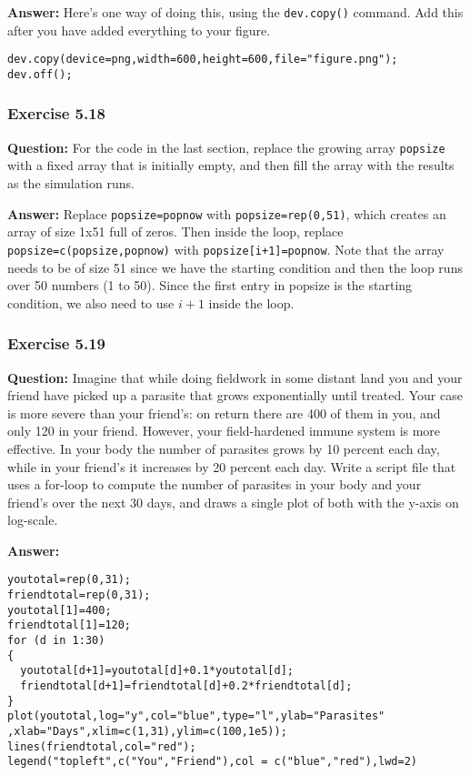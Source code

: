 \documentclass [11pt]{article}
\newcommand{\code}[1]{{\tt #1}}
\begin{document}
\textbf{Answer:} 
Here's one way of doing this, using the \code{dev.copy()} command. Add this after you have added everything to your figure.
\begin{verbatim}
dev.copy(device=png,width=600,height=600,file="figure.png"); dev.off();
\end{verbatim}



\subsubsection*{Exercise 5.18}
\textbf{Question:}
For the code in the last section, replace the growing array \code{popsize} with a fixed array that is initially empty, and then fill the array with the results as the simulation runs.

\textbf{Answer:} Replace \code{popsize=popnow} with \code{popsize=rep(0,51)}, which creates an array of size 1x51 full of zeros. Then inside the loop, replace \code{popsize=c(popsize,popnow)} with \code{popsize[i+1]=popnow}. Note that the array needs to be of size 51 since we have the starting condition and then the loop runs over 50 numbers (1 to 50). Since the first entry in popsize is the starting condition, we also need to use $i+1$ inside the loop.

\subsubsection*{Exercise 5.19}
\textbf{Question:}
Imagine that while doing fieldwork in some 
distant land you and your friend have picked up a parasite that grows 
exponentially until treated. Your case is more severe than your friend's: 
on return there are 400 of them in you, and only 120 in your 
friend. However, your field-hardened immune system is more effective. In 
your body the number of parasites grows by 10 percent each day, while in 
your friend's it increases by 20 percent each day. Write a script file that uses a for-loop to compute the 
number of parasites in your body and your friend's over the next 30 days, 
and draws a single plot of both with the y-axis on log-scale. 

\textbf{Answer:}
\begin{verbatim}
youtotal=rep(0,31);
friendtotal=rep(0,31);
youtotal[1]=400;
friendtotal[1]=120;
for (d in 1:30)
{
  youtotal[d+1]=youtotal[d]+0.1*youtotal[d];
  friendtotal[d+1]=friendtotal[d]+0.2*friendtotal[d];
}
plot(youtotal,log="y",col="blue",type="l",ylab="Parasites"
,xlab="Days",xlim=c(1,31),ylim=c(100,1e5));
lines(friendtotal,col="red");
legend("topleft",c("You","Friend"),col = c("blue","red"),lwd=2)
\end{verbatim}
\end{document}
